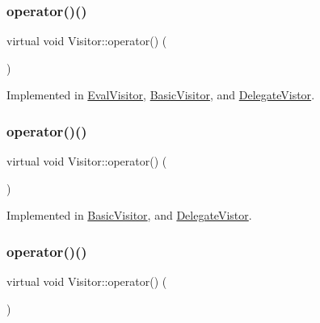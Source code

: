 \subsubsection{\texorpdfstring{operator()()}{operator()()}\hspace{0.1cm}{\footnotesize\ttfamily [27/60]}}
{\footnotesize\ttfamily virtual void Visitor\+::operator() (\begin{DoxyParamCaption}\item[{const \hyperlink{struct_expression_statement}{Expression\+Statement} \&}]{ }\end{DoxyParamCaption})\hspace{0.3cm}{\ttfamily [pure virtual]}}



Implemented in \hyperlink{class_eval_visitor_a7122ac9fb6f1ef01696296b6bd2edbeb}{Eval\+Visitor}, \hyperlink{struct_basic_visitor_a6c369f60a28dffd5149258e32a81cb6e}{Basic\+Visitor}, and \hyperlink{struct_delegate_vistor_af45b11b7a3b3bb2e213c182cd98c517e}{Delegate\+Vistor}.

\mbox{\label{struct_visitor_a9d30bc5ad73a274f7533df4b5a65ae41}} 
\subsubsection{\texorpdfstring{operator()()}{operator()()}\hspace{0.1cm}{\footnotesize\ttfamily [28/60]}}
{\footnotesize\ttfamily virtual void Visitor\+::operator() (\begin{DoxyParamCaption}\item[{const \hyperlink{struct_if_statement}{If\+Statement} \&}]{ }\end{DoxyParamCaption})\hspace{0.3cm}{\ttfamily [pure virtual]}}



Implemented in \hyperlink{struct_basic_visitor_a4d4e3621e47ea469c0e59d0b1c6c657b}{Basic\+Visitor}, and \hyperlink{struct_delegate_vistor_ab863b34aedf8480973ed8615a148da5d}{Delegate\+Vistor}.

\mbox{\label{struct_visitor_a077a0025430c4b35d310bdfcbe1b180a}} 
\subsubsection{\texorpdfstring{operator()()}{operator()()}\hspace{0.1cm}{\footnotesize\ttfamily [29/60]}}
{\footnotesize\ttfamily virtual void Visitor\+::operator() (\begin{DoxyParamCaption}\item[{const \hyperlink{struct_do_while_statement}{Do\+While\+Statement} \&}]{ }\end{DoxyParamCaption})\hspace{0.3cm}{\ttfamily [pure virtual]}}



